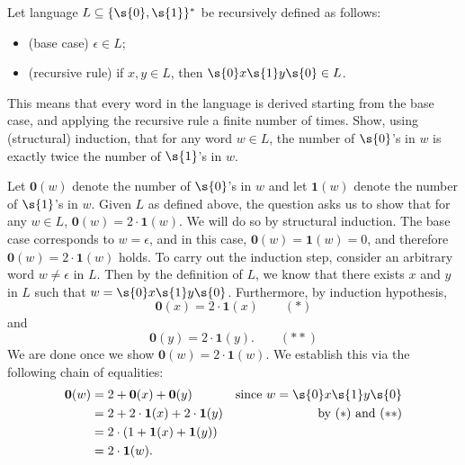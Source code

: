 \begin{flex}
\begin{exercise} \label{exercise:Structural-induction-on-words}
Let language $L \subseteq \{\s{0},\s{1}\}^*$ be recursively defined as follows:
\begin{itemize}
    \item (base case) $\epsilon \in L$;
    \item (recursive rule) if $x, y \in L$, then $\s{0}x\s{1}y\s{0} \in L$.
\end{itemize}
This means that every word in the language is derived starting from the base case, and applying the recursive rule a finite number of times. 
Show, using (structural) induction, that for any word $w \in L$, the number of $\s{0}$'s in $w$ is exactly twice the number of $\s{1}$'s in $w$.
\end{exercise}
\begin{solution}
Let $\mathbf{0}(w)$ denote the number of $\s{0}$'s in $w$ and let $\mathbf{1}(w)$ denote the number of $\s{1}$'s in $w$. Given $L$ as defined above, the question asks us to show that for any $w \in L$, $\mathbf{0}(w) = 2 \cdot \mathbf{1}(w)$. We will do so by structural induction.
The base case corresponds to $w = \epsilon$, and in this case, $\mathbf{0}(w) = \mathbf{1}(w) = 0$, and therefore $\mathbf{0}(w) = 2 \cdot \mathbf{1}(w)$ holds.
To carry out the induction step, consider an arbitrary word $w \neq \epsilon$ in $L$. Then by the definition of $L$, we know that there exists $x$ and $y$ in $L$ such that $w = \s{0}x\s{1}y\s{0}$. Furthermore, by induction hypothesis, 
\begin{equation*} %
    \mathbf{0}(x) = 2 \cdot \mathbf{1}(x) \quad \quad (*)
\end{equation*}
and 
\begin{equation*} %
    \mathbf{0}(y) = 2 \cdot \mathbf{1}(y). \quad \quad (**)
\end{equation*}
We are done once we show $\mathbf{0}(w) = 2 \cdot \mathbf{1}(w)$. We establish this via the following chain of equalities: 
\begin{align*}
    \mathbf{0}(w) & = 2 + \mathbf{0}(x) + \mathbf{0}(y) & \text{since $w = \s{0}x\s{1}y\s{0}$} \\
    & = 2 + 2 \cdot \mathbf{1}(x) + 2 \cdot \mathbf{1}(y) & \text{by $(*)$ and $(**)$}\\
    & = 2 \cdot (1 + \mathbf{1}(x) + \mathbf{1}(y)) \\
    & = 2 \cdot \mathbf{1}(w).
\end{align*}
\end{solution}
\end{flex}
